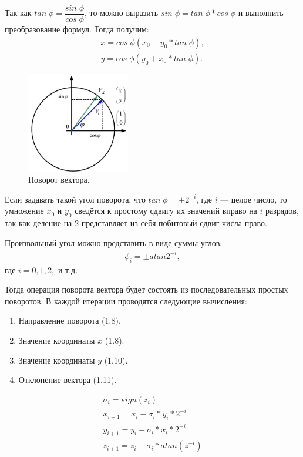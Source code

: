 	Так как $tan\;\phi=\dfrac{sin\;\phi}{cos\;\phi}$, то можно выразить $sin\;\phi=tan\;\phi*cos\;\phi$ и выполнить преобразование формул. Тогда получим:
	\begin{gather}
	x=cos\;\phi(x_{0}-y_{0}*tan\;\phi), \\
	y=cos\;\phi(y_{0}+x_{0}*tan\;\phi). 
	\end{gather}
	
	\begin{figure}[H]
    \centering
    \includegraphics[width=0.4\textwidth]{../image/cordic2.png}
    \caption{Поворот вектора.}
	\end{figure}

	Если задавать такой угол поворота, что $tan\;\phi = \pm 2^{-i}$, где $i$ --- целое число, то умножение $x_{0}$ и $y_{0}$ сведётся к простому сдвигу их значений вправо на $i$ разрядов, так как деление на 2 представляет из себя побитовый сдвиг числа право.

	Произвольный угол можно представить в виде суммы углов:
	\begin{gather}
	\phi_{i}=\pm atan2^{-i}, 
	\end{gather}	
	где $i = 0, 1, 2,$ и т.д.

	Тогда операция поворота вектора будет состоять из последовательных простых поворотов. В каждой итерации проводятся следующие вычисления:
	\begin{enumerate}
	\item Направление поворота (1.8).
	\item Значение координаты $x$ (1.8).
	\item Значение координаты $y$ (1.10).
	\item Отклонение вектора	(1.11).
	\end{enumerate}
	\begin{gather}
	\sigma_{i} 	= sign(z_{i}) \\
	x_{i+1} = x_{i} - \sigma_{i}*y_{i}*2^{-i} \\
	y_{i+1} = y_{i} + \sigma_{i}*x_{i}*2^{-i} \\
	z_{i+1} = z_{i} - \sigma_{i}*atan(z^{-i}) 
	\end{gather}
	
